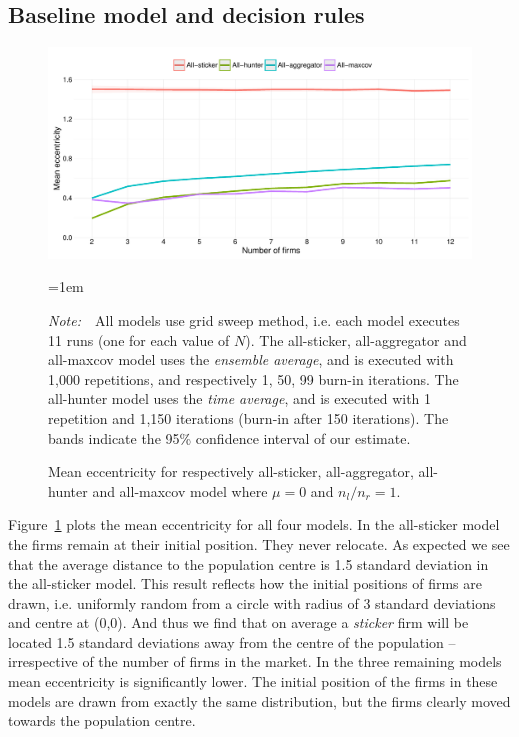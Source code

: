 \documentclass[preprint, 12pt]{elsarticle}
\newcommand{\Figtext}[1]{%
	\begin{tablenotes}[para,flushleft]
		\hangindent=1em
		\footnotesize
		\raggedright
		#1
	\end{tablenotes}
}
\newcommand{\Fignote}[1]{\Figtext{\emph{Note:~}~#1}}
\begin{document}
\subsection{Baseline model and decision rules}

\begin{figure}[ht!]
	\centering
	\includegraphics[width=\textwidth]{Graphics/fig21a.pdf}
	\caption{Mean eccentricity for respectively all-sticker, all-aggregator, all-hunter and all-maxcov model where $\mu=0$ and $n_l/n_r=1$.}
	\label{fig:eccentricity}
	\Fignote{All models use grid sweep method, i.e. each model executes 11 runs (one for each value of $N$). The all-sticker, all-aggregator and all-maxcov model uses the \emph{ensemble average}, and is executed with 1,000 repetitions, and respectively 1, 50, 99 burn-in iterations. The all-hunter model uses the \emph{time average}, and is executed with 1 repetition and 1,150 iterations (burn-in after 150 iterations). The bands indicate the 95\% confidence interval of our estimate.}
\end{figure}

Figure~\ref{fig:eccentricity} plots the mean eccentricity for all four models. In the all-sticker model the firms remain at their initial position. They never relocate. As expected we see that the average distance to the population centre is 1.5 standard deviation in the all-sticker model. This result reflects how the initial positions of firms are drawn, i.e. uniformly random from a circle with radius of 3 standard deviations and centre at (0,0). And thus we find that on average a \emph{sticker} firm will be located 1.5 standard deviations away from the centre of the population -- irrespective of the number of firms in the market. In the three remaining models mean eccentricity is significantly lower. The initial position of the firms in these models are drawn from exactly the same distribution, but the firms clearly moved towards the population centre. 
\end{document}
